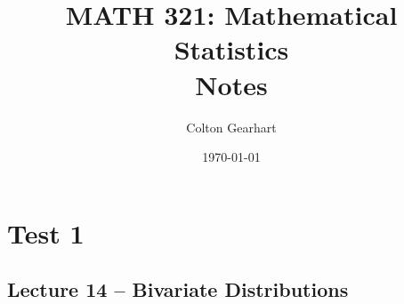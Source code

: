 \documentclass{article}
\title{MATH 321: Mathematical Statistics\\ Notes}
\author{Colton Gearhart}
\date{\today}
\begin{document}
\setcounter{secnumdepth}{0}		%
\maketitle
\dosecttoc
\tableofcontents
\newpage

\section{Test 1}

\secttoc

\subsection{Lecture 14 -- Bivariate Distributions}
\newpage
%
%
%
%
%
%
\end{document}
